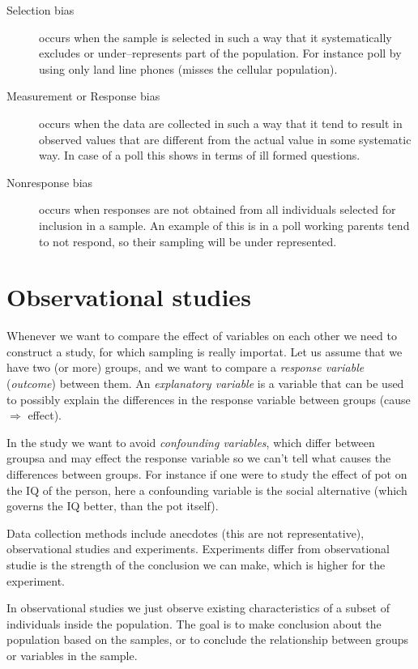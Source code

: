 \begin{description}
	\item[Selection bias] occurs when the sample is selected in such a way that it
	      systematically excludes or under--represents part of the population. For
	      instance poll by using only land line phones (misses the cellular population).
	\item[Measurement or Response bias] occurs when the data are collected in such
	      a way that it tend to result in observed values that are different from the
	      actual value in some systematic way. In case of a poll this shows in terms of
	      ill formed questions.
	\item[Nonresponse bias] occurs when responses are not obtained from all
	      individuals selected for inclusion in a sample. An example of this is in a
	      poll working parents tend to not respond, so their sampling will be under
	      represented.
\end{description}

\section{Observational studies}

Whenever we want to compare the effect of variables on each other we need to
construct a study, for which sampling is really importat. Let us assume that we
have two (or more) groups,  and we want to compare a \emph{response variable}
(\emph{outcome}) between them. An \emph{explanatory variable} is a variable that
can be used to possibly explain the differences in the response variable between
groups (cause $\Rightarrow$ effect).

In the study we want to avoid \emph{confounding variables}, which differ between
groupsa and may effect the response variable so we can't tell what causes the
differences between groups. For instance if one were to study the effect of pot
on the IQ of the person, here a confounding variable is the social alternative
(which governs the IQ better, than the pot itself).

Data collection methods include anecdotes (this are not representative),
observational studies and experiments. Experiments differ from observational
studie is the strength of the conclusion we can make, which is higher for the
experiment.

In observational studies we just observe existing characteristics of a subset of
individuals inside the population. The goal is to make conclusion about the
population based on the samples, or to conclude the relationship between groups
or variables in the sample.

